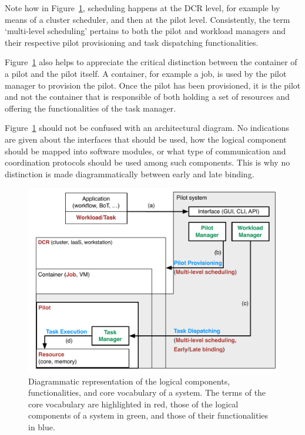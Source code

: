 \documentclass{sig-alternate}
\begin{document}
Note how in Figure~\ref{fig:core_vocabulary}, scheduling happens at the DCR
level, for example by means of a cluster scheduler, and then at the pilot level.
Consistently, the term `multi-level scheduling' pertains to both the pilot and
workload managers and their respective pilot provisioning and task dispatching
functionalities.

Figure~\ref{fig:core_vocabulary} also helps to appreciate the critical
distinction between the container of a pilot and the pilot itself. A container,
for example a job, is used by the pilot manager to provision the pilot. Once the
pilot has been provisioned, it is the pilot and not the container that is
responsible of both holding a set of resources and offering the functionalities
of the task manager.


Figure~\ref{fig:core_vocabulary} should not be confused with an architectural
diagram. No indications are given about the interfaces that should be used, how
the logical component should be mapped into software modules, or what type of
communication and coordination protocols should be used among such components.
This is why no distinction is made diagrammatically between early and late
binding.


\begin{figure}[t]
    \centering
        \includegraphics[width=.48\textwidth]{figures/core_vocabulary.pdf}
    \caption{Diagrammatic representation of the logical components,
    functionalities, and core vocabulary of a \pilot system. The terms of the
    core vocabulary are highlighted in red, those of the logical components of
    a \pilot system in green, and those of their functionalities in blue.}
    \label{fig:core_vocabulary}
\end{figure}
\end{document}
